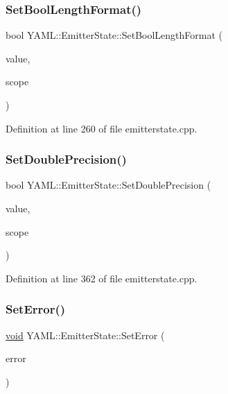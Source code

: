\subsubsection{\texorpdfstring{SetBoolLengthFormat()}{SetBoolLengthFormat()}}
{\footnotesize\ttfamily bool Y\+A\+M\+L\+::\+Emitter\+State\+::\+Set\+Bool\+Length\+Format (\begin{DoxyParamCaption}\item[{\mbox{\hyperlink{namespace_y_a_m_l_a67c320aa50d3de7ecba1d0b8775dd684}{E\+M\+I\+T\+T\+E\+R\+\_\+\+M\+A\+N\+IP}}}]{value,  }\item[{\mbox{\hyperlink{struct_y_a_m_l_1_1_fmt_scope_a58c967eadfafdc79f62cd5c59ec2b1fe}{Fmt\+Scope\+::value}}}]{scope }\end{DoxyParamCaption})}



Definition at line 260 of file emitterstate.\+cpp.

\mbox{\label{class_y_a_m_l_1_1_emitter_state_a16f6e7ce69d138b8b10d766e92a05443}} 
\subsubsection{\texorpdfstring{SetDoublePrecision()}{SetDoublePrecision()}}
{\footnotesize\ttfamily bool Y\+A\+M\+L\+::\+Emitter\+State\+::\+Set\+Double\+Precision (\begin{DoxyParamCaption}\item[{std\+::size\+\_\+t}]{value,  }\item[{\mbox{\hyperlink{struct_y_a_m_l_1_1_fmt_scope_a58c967eadfafdc79f62cd5c59ec2b1fe}{Fmt\+Scope\+::value}}}]{scope }\end{DoxyParamCaption})}



Definition at line 362 of file emitterstate.\+cpp.

\mbox{\label{class_y_a_m_l_1_1_emitter_state_a215eac3f45cc35ccd2e42052a2724387}} 
\subsubsection{\texorpdfstring{SetError()}{SetError()}}
{\footnotesize\ttfamily \mbox{\hyperlink{glad_8h_a950fc91edb4504f62f1c577bf4727c29}{void}} Y\+A\+M\+L\+::\+Emitter\+State\+::\+Set\+Error (\begin{DoxyParamCaption}\item[{const \mbox{\hyperlink{glad_8h_ac83513893df92266f79a515488701770}{std\+::string}} \&}]{error }\end{DoxyParamCaption})\hspace{0.3cm}{\ttfamily [inline]}}



